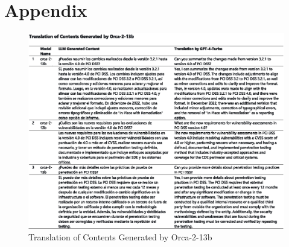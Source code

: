 \documentclass[runningheads]{llncs}
\begin{document}

%
%
%



\appendix
\section{Appendix}

\begin{figure}
    \centering
    \includegraphics[width=0.9\linewidth]{figures/translation.eps}
    \caption{Translation of Contents Generated by Orca-2-13b}
    \label{fig:translation}
\end{figure}
\end{document}
